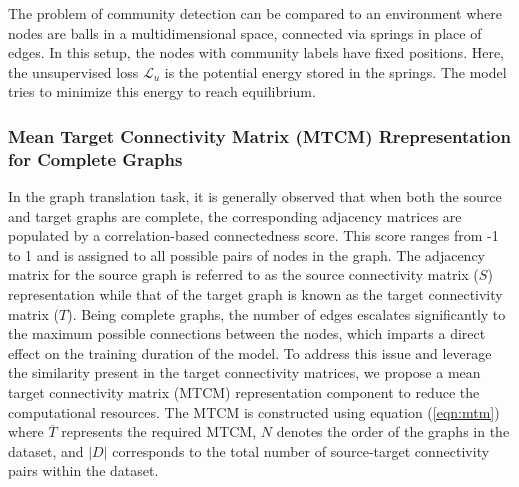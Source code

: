 \begin{comment}
\begin{equation}
\begin{split}
\mathcal{L} &= \mathcal{L}_s + \mathcal{L}_u\\
&= \mathcal{L}_s + \sum_{(u,v) \in E}\sum_{c=0}^{C-1}\frac{1}{C}\times(O[u][c]-O[v][c])^2
\end{split}
\label{eqn:unsup_loss}
\end{equation} 
\end{comment}

The problem of community detection can be compared to an environment where nodes are balls in a multidimensional space, connected via springs in place of edges. In this setup, the nodes with community labels have fixed positions. Here, the unsupervised loss $\mathcal{L}_u$ is the potential energy stored in the springs. The model tries to minimize this energy to reach equilibrium. 






\subsubsection{Mean Target Connectivity Matrix (MTCM) Rrepresentation for Complete Graphs}
\label{mtcm}
In the graph translation task, it is generally observed that when both the source and target graphs are complete, the corresponding adjacency matrices are populated by a correlation-based connectedness score. This score ranges from -1 to 1 and is assigned to all possible pairs of nodes in the graph. The adjacency matrix for the source graph is referred to as the source connectivity matrix ($S$) representation while that of the target graph is known as the target connectivity matrix ($T$). Being complete graphs, the number of edges escalates significantly to the maximum possible connections between the nodes, which imparts a direct effect on the training duration of the model. To address this issue and leverage the similarity present in the target connectivity matrices, we propose a mean target connectivity matrix (MTCM) representation component to reduce the computational resources. The MTCM is constructed using equation (\ref{eqn:mtm}) where $\overline{T}$ represents the required MTCM, $N$ denotes the order of the graphs in the dataset, and $|D|$ corresponds to the total number of source-target connectivity pairs within the dataset.

